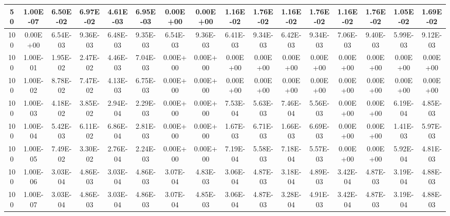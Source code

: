 \begin{table}[H]
\begin{center}
{\begin{tabular}{|c|c|c|c|c|c|c|c|c|c|c|c|c|c|c|c|}
50    &    1.00E-07    &    6.50E-02    &    6.97E-02    &    4.61E-03    &    6.95E-03    &    0.00E+00    &    0.00E+00    &    1.16E-02    &    1.76E-02    &    1.16E-02    &    1.76E-02    &    1.16E-02    &    1.76E-02    &    1.05E-02    &    1.69E-02    \\ \hline
100    &    0.00E+00    &    6.54E-03    &    9.36E-03    &    6.48E-03    &    9.35E-03    &    6.54E-03    &    9.36E-03    &    6.41E-03    &    9.34E-03    &    6.42E-03    &    9.34E-03    &    7.06E-03    &    9.40E-03    &    5.99E-03    &    9.12E-03    \\ \hline
100    &    1.00E-01    &    1.95E-02    &    2.47E-02    &    4.46E-03    &    7.04E-03    &    0.00E+00    &    0.00E+00    &    0.00E+00    &    0.00E+00    &    0.00E+00    &    0.00E+00    &    0.00E+00    &    0.00E+00    &    0.00E+00    &    0.00E+00    \\ \hline
100    &    1.00E-02    &    8.78E-02    &    7.47E-02    &    4.13E-03    &    6.75E-03    &    0.00E+00    &    0.00E+00    &    0.00E+00    &    0.00E+00    &    0.00E+00    &    0.00E+00    &    0.00E+00    &    0.00E+00    &    0.00E+00    &    0.00E+00    \\ \hline
100    &    1.00E-03    &    4.18E-02    &    3.85E-02    &    2.94E-04    &    2.29E-03    &    0.00E+00    &    0.00E+00    &    7.53E-04    &    5.63E-03    &    7.46E-04    &    5.56E-03    &    0.00E+00    &    0.00E+00    &    6.19E-04    &    4.85E-03    \\ \hline
100    &    1.00E-04    &    5.42E-03    &    6.11E-02    &    6.86E-04    &    2.81E-03    &    0.00E+00    &    0.00E+00    &    1.67E-03    &    6.71E-03    &    1.66E-03    &    6.69E-03    &    0.00E+00    &    0.00E+00    &    1.41E-03    &    5.97E-03    \\ \hline
100    &    1.00E-05    &    7.49E-02    &    3.30E-02    &    2.76E-04    &    2.24E-03    &    0.00E+00    &    0.00E+00    &    7.19E-04    &    5.58E-03    &    7.18E-04    &    5.57E-03    &    0.00E+00    &    0.00E+00    &    5.92E-04    &    4.81E-03    \\ \hline
100    &    1.00E-06    &    3.03E-04    &    4.86E-03    &    3.03E-04    &    4.86E-03    &    3.07E-04    &    4.83E-03    &    3.06E-04    &    4.87E-03    &    3.18E-04    &    4.89E-03    &    3.42E-04    &    4.87E-03    &    3.19E-04    &    4.88E-03    \\ \hline
100    &    1.00E-07    &    3.03E-04    &    4.86E-03    &    3.03E-04    &    4.86E-03    &    3.07E-04    &    4.85E-03    &    3.06E-04    &    4.87E-03    &    3.28E-04    &    4.91E-03    &    3.42E-04    &    4.87E-03    &    3.19E-04    &    4.88E-03    \\ \hline

\end{tabular}}
\end{center}
\end{table}
